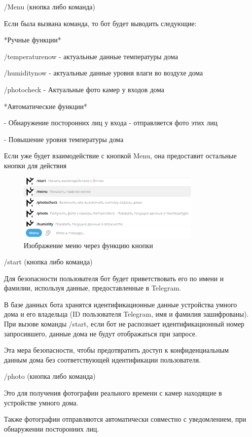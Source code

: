 /Menu (кнопка либо команда)

Если была вызвана команда, то бот будет выводить следующие: 

*Ручные функции*

/temperaturenow - актуальные данные температуры дома

/humiditynow - актуальные данные уровня влаги во воздухе дома

/photocheck - Актуальные фото камер у входов дома

*Автоматические функции*

- Обнаружение посторонних лиц у входа  - отправляется фото этих лиц

- Повышение уровня температуры дома

Если уже будет взаимодействие с кнопкой Menu, она предоставит остальные кнопки для действия

\begin{figure}[h!]
	\centering
	\label{fig:img24}
	\includegraphics[width=0.8\textwidth]{./graphics/img/image24.png}
	\caption{Изображение меню через функцию кнопки}
\end{figure}

/start (кнопка либо команда)

Для безопасности пользователя бот будет приветствовать его по имени и фамилии, используя данные, предоставленные в Telegram. 

В базе данных бота хранятся идентификационные данные устройства умного дома и его владельца (ID пользователя Telegram, имя и фамилия зашифрованы). При вызове команды /start, если бот не распознает идентификационный номер запросившего, данные дома не будут отображаться при запросе. 

Эта мера безопасности, чтобы предотвратить доступ к конфиденциальным данным дома без соответствующей идентификации пользователя.

/photo (кнопка либо команда)

Это для получения фотографии реального времени с камер находящие в устройстве умного дома.

Также фотографии отправляются автоматически совместно с уведомлением, при обнаружении посторонних лиц.

